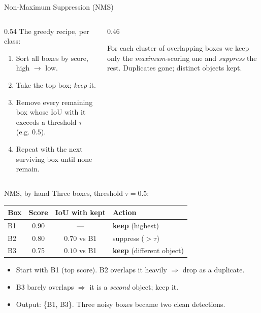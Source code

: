 \documentclass[10pt,aspectratio=169]{beamer}
\begin{document}
\begin{frame}{Non-Maximum Suppression (NMS)}
  \begin{columns}[T]
    \begin{column}{0.54\textwidth}
      The greedy recipe, per class:
      \begin{enumerate}
        \item Sort all boxes by score, high $\to$ low.
        \item Take the top box; \emph{keep} it.
        \item Remove every remaining box whose IoU with it exceeds a threshold $\tau$ (e.g. $0.5$).
        \item Repeat with the next surviving box until none remain.
      \end{enumerate}
    \end{column}
    \begin{column}{0.46\textwidth}
      \begin{infobox}
        For each cluster of overlapping boxes we keep only the \emph{maximum}-scoring one and \emph{suppress} the rest. Duplicates gone; distinct objects kept.
      \end{infobox}
    \end{column}
  \end{columns}
\end{frame}

\begin{frame}{NMS, by hand}
  Three boxes, threshold $\tau=0.5$:
  \begin{center}
  \begin{tabular}{@{}lccl@{}}
    \toprule
    \textbf{Box} & \textbf{Score} & \textbf{IoU with kept} & \textbf{Action} \\
    \midrule
    B1 & 0.90 & --- & \textbf{keep} (highest) \\
    B2 & 0.80 & $0.70$ vs B1 & suppress ($>\tau$) \\
    B3 & 0.75 & $0.10$ vs B1 & \textbf{keep} (different object) \\
    \bottomrule
  \end{tabular}
  \end{center}
  \begin{itemize}
    \item Start with B1 (top score). B2 overlaps it heavily $\Rightarrow$ drop as a duplicate.
    \item B3 barely overlaps $\Rightarrow$ it is a \emph{second} object; keep it.
    \item Output: \{B1, B3\}. Three noisy boxes became two clean detections.
  \end{itemize}
\end{frame}
\end{document}

